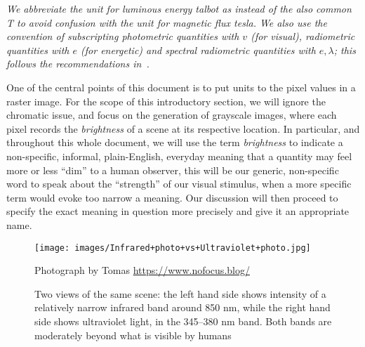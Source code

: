 \begin{sidewaystable}
{}
\vskip 1mm
{\footnotesize\it We abbreviate the unit for luminous energy \textit{talbot} as
\unit{\talbot} instead of the also common \unit{\tesla} to avoid confusion with the
unit for magnetic flux \textit{tesla}.
We also use the convention of subscripting photometric quantities
with $v$ (for \textit{visual}), radiometric quantities with $e$ (for
\textit{energetic}) and spectral radiometric quantities with $e,\lambda$;
this follows the recommendations in~\cite{iso:80000-7:2019,cie:s017.2020,iec:60050-845:2020}.}
\end{sidewaystable}


One of the central points of this document is to put units to the pixel values in a raster image. 
For the scope of this introductory section, we will ignore the chromatic issue, and focus on 
the generation of grayscale images, where each pixel records the \textsl{\gls{brightness}} of 
a scene at its respective location. 
In particular, and throughout this whole document, we will use the term \textsl{brightness} 
to indicate a non-specific, informal, plain-English, everyday meaning that a quantity may 
feel more or less ``dim'' to a human observer, this will be our generic, non-specific word to
speak about the ``strength'' of our visual stimulus, when a more specific term would evoke too
narrow a meaning. 
Our discussion will then proceed to specify the exact meaning in question more 
precisely and give it an appropriate name.

\begin{figure}
	{
		\hfill
		\texttt{[image: images/Infrared+photo+vs+Ultraviolet+photo.jpg]}
		\hfill
	}	

	\caption{\label{fig:uv_ir_photo}
		Two views of the same scene: the left hand side
		shows intensity of a relatively narrow infrared band around 850 \unit{\nano\meter},
		while the right hand side shows ultraviolet light, 
		in the 345--380 \unit{\nano\meter} band. 
		Both bands are moderately beyond what is visible by humans}
	{\scriptsize\hfill
		Photograph by Tomas \url{https://www.nofocus.blog/}
	}
\end{figure}

